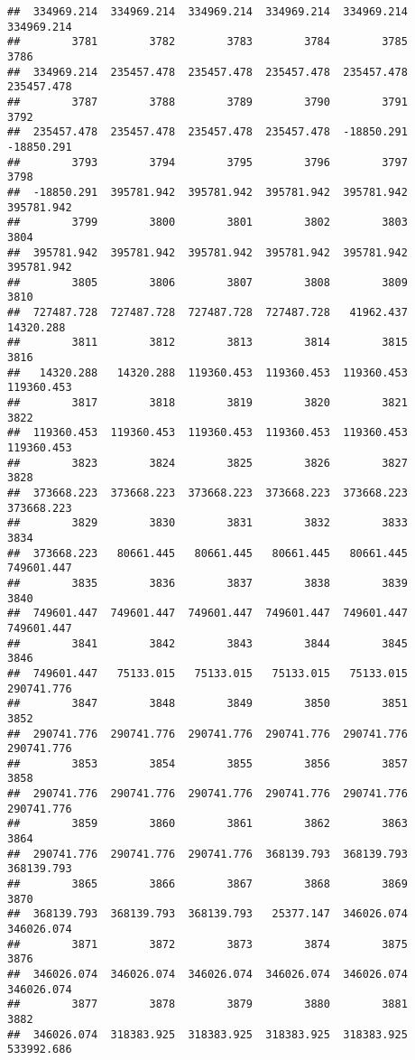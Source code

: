 \documentclass[
]{book}
\begin{document}
\begin{verbatim}
##  334969.214  334969.214  334969.214  334969.214  334969.214  334969.214 
##        3781        3782        3783        3784        3785        3786 
##  334969.214  235457.478  235457.478  235457.478  235457.478  235457.478 
##        3787        3788        3789        3790        3791        3792 
##  235457.478  235457.478  235457.478  235457.478  -18850.291  -18850.291 
##        3793        3794        3795        3796        3797        3798 
##  -18850.291  395781.942  395781.942  395781.942  395781.942  395781.942 
##        3799        3800        3801        3802        3803        3804 
##  395781.942  395781.942  395781.942  395781.942  395781.942  395781.942 
##        3805        3806        3807        3808        3809        3810 
##  727487.728  727487.728  727487.728  727487.728   41962.437   14320.288 
##        3811        3812        3813        3814        3815        3816 
##   14320.288   14320.288  119360.453  119360.453  119360.453  119360.453 
##        3817        3818        3819        3820        3821        3822 
##  119360.453  119360.453  119360.453  119360.453  119360.453  119360.453 
##        3823        3824        3825        3826        3827        3828 
##  373668.223  373668.223  373668.223  373668.223  373668.223  373668.223 
##        3829        3830        3831        3832        3833        3834 
##  373668.223   80661.445   80661.445   80661.445   80661.445  749601.447 
##        3835        3836        3837        3838        3839        3840 
##  749601.447  749601.447  749601.447  749601.447  749601.447  749601.447 
##        3841        3842        3843        3844        3845        3846 
##  749601.447   75133.015   75133.015   75133.015   75133.015  290741.776 
##        3847        3848        3849        3850        3851        3852 
##  290741.776  290741.776  290741.776  290741.776  290741.776  290741.776 
##        3853        3854        3855        3856        3857        3858 
##  290741.776  290741.776  290741.776  290741.776  290741.776  290741.776 
##        3859        3860        3861        3862        3863        3864 
##  290741.776  290741.776  290741.776  368139.793  368139.793  368139.793 
##        3865        3866        3867        3868        3869        3870 
##  368139.793  368139.793  368139.793   25377.147  346026.074  346026.074 
##        3871        3872        3873        3874        3875        3876 
##  346026.074  346026.074  346026.074  346026.074  346026.074  346026.074 
##        3877        3878        3879        3880        3881        3882 
##  346026.074  318383.925  318383.925  318383.925  318383.925  533992.686 

\end{verbatim}
\end{document}
